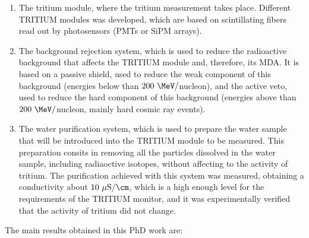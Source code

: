 \begin{enumerate}

\item{} The tritium module, where the tritium measurement takes place. Different TRITIUM modules was developed, which are based on scintillating fibers read out by photosensors (PMTs or SiPM arrays).

\item{} The background rejection system, which is used to reduce the radioactive background that affects the TRITIUM module and, therefore, its MDA. It is based on a passive shield, used to reduce the weak component of this background (energies below than $200~\MeV/$nucleon), and the active veto, used to reduce the hard component of this background (energies above than $200~\MeV/$nucleon, mainly hard cosmic ray events).

\item{} The water purification system, which is used to prepare the water sample that will be introduced into the TRITIUM module to be measured. This preparation consits in removing all the particles dissolved in the water sample, including radiaoctive isotopes, without affecting to the activity of tritium. The purification achieved with this system was measured, obtaining a conductivity about $10~\mu\text{S}/\cm$, which is a high enough level for the requirements of the TRITIUM monitor, and it was experimentally verified that the activity of tritium did not change.

\end{enumerate} 
The main results obtained in this PhD work are:
